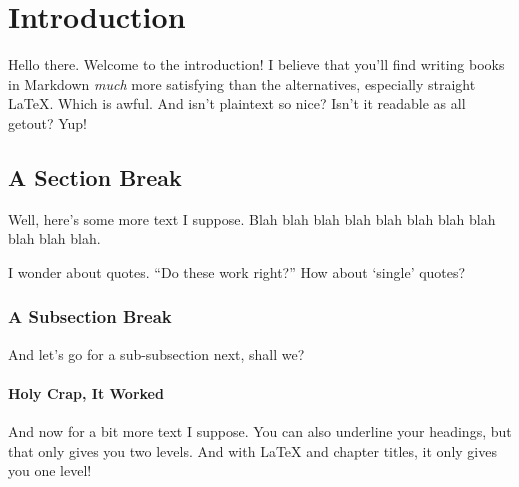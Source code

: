 \chapter*{Introduction}

Hello there. Welcome to the introduction! I believe that you'll find
writing books in Markdown \emph{much} more satisfying than the
alternatives, especially straight LaTeX. Which is awful. And isn't
plaintext so nice? Isn't it readable as all getout? Yup!

\section{A Section Break}

Well, here's some more text I suppose. Blah blah blah blah blah blah
blah blah blah blah blah.

I wonder about quotes. ``Do these work right?'' How about `single'
quotes?

\subsection{A Subsection Break}

And let's go for a sub-subsection next, shall we?

\subsubsection{Holy Crap, It Worked}

And now for a bit more text I suppose. You can also underline your
headings, but that only gives you two levels. And with LaTeX and chapter
titles, it only gives you one level!
